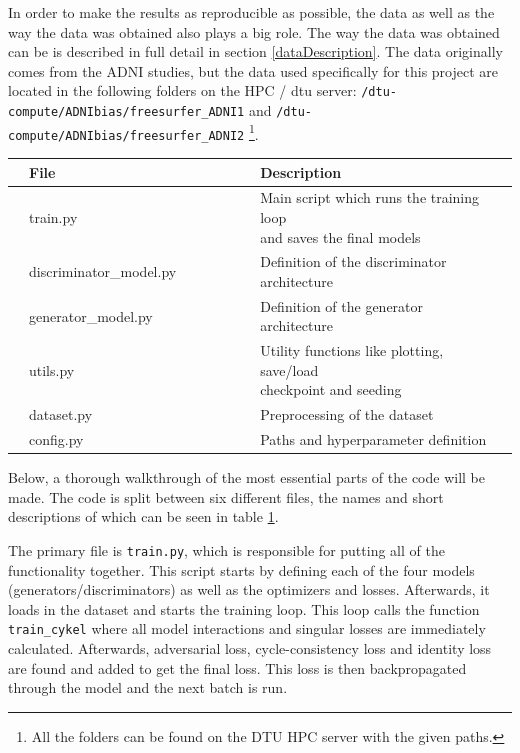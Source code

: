 \documentclass[12pt, fleqn, titlepage]{article}
\newcommand{\1}[1]{\mathds{1}\left[#1\right]}
\begin{document}
In order to make the results as reproducible as possible, the data as well as the way the data was obtained also plays a big role. The way the data was obtained can be is described in full detail in section \ref{dataDescription}. The data originally comes from the ADNI studies, but the data used specifically for this project are located in the following folders on the HPC / dtu server: \texttt{/dtu-compute/ADNIbias/freesurfer\_ADNI1} and \texttt{/dtu-compute/ADNIbias/freesurfer\_ADNI2} \footnote{All the folders can be found on the DTU HPC server with the given paths.}. \\

\begin{table}[H]\label{fig:files}
	\begin{center}
		\begin{tabular}{l l l l l l l l l}
			\toprule
			& \textbf{File}          & & & & & & \textbf{Description}  & \\ \midrule
			& train.py               & & & & & & \makecell[tl]{Main script which runs the training loop \\ and saves the final models} & \\
			& discriminator\_model.py& & & & & & Definition of the discriminator architecture & \\
			& generator\_model.py    & & & & & & Definition of the generator architecture & \\
			& utils.py               & & & & & & \makecell[tl]{Utility functions like plotting, save/load \\ checkpoint and seeding} & \\
			& dataset.py             & & & & & & Preprocessing of the dataset & \\
			& config.py              & & & & & & Paths and hyperparameter definition & \\ \bottomrule
		\end{tabular}
	\end{center}
\end{table}

\noindent Below, a thorough walkthrough of the most essential parts of the code will be made. The code is split between six different files, the names and short descriptions of which can be seen in table \ref{fig:files}. 

The primary file is \texttt{train.py}, which is responsible for putting all of the functionality together. This script starts by defining each of the four models (generators/discriminators) as well as the optimizers and losses. Afterwards, it loads in the dataset and starts the training loop. This loop calls the function \texttt{train\_cykel} where all model interactions and singular losses are immediately calculated. Afterwards, adversarial loss, cycle-consistency loss and identity loss are found and added to get the final loss. This loss is then backpropagated through the model and the next batch is run.
\end{document}
